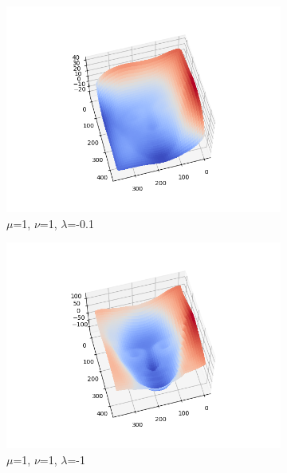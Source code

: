 \documentclass{article}
\begin{document}
\begin{figure}[H]
	\centering
	\begin{subfigure}{0.33\textwidth}
		\centering
		\includegraphics[width=\textwidth]{./src/2f_lambda_change/faceCalibrated_mu_1_v_1_lambda_-0.1.png}
		\caption{$\mu$=1, $\nu$=1, $\lambda$=-0.1}
	\end{subfigure}
	\hfill
	\begin{subfigure}{0.32\textwidth}
		\centering
		\includegraphics[width=\textwidth]{./src/2f_lambda_change/faceCalibrated_mu_1_v_1_lambda_-1.png}
		\caption{$\mu$=1, $\nu$=1, $\lambda$=-1}
	\end{subfigure}
	\hfill
	\begin{subfigure}{0.32\textwidth}

\end{subfigure}
\end{figure}
\end{document}
